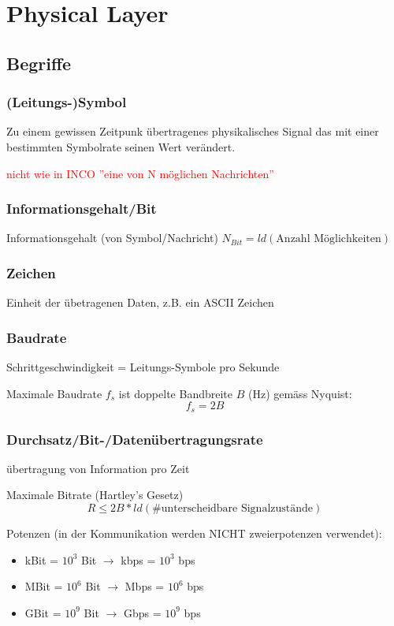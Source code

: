 \section{Physical Layer}

\subsection{Begriffe}

\subsubsection{(Leitungs-)Symbol}
Zu einem gewissen Zeitpunk übertragenes physikalisches Signal das mit einer
bestimmten Symbolrate seinen Wert verändert.

\textcolor{red}{nicht wie in INCO ''eine von N möglichen Nachrichten''}

\subsubsection{Informationsgehalt/Bit}
Informationsgehalt (von Symbol/Nachricht)
$ N_{Bit} = ld(\text{Anzahl Möglichkeiten}) $

\subsubsection{Zeichen}
Einheit der übetragenen Daten, z.B. ein ASCII Zeichen

\subsubsection{Baudrate}
Schrittgeschwindigkeit = Leitungs-Symbole pro Sekunde

Maximale Baudrate $f_s$ ist doppelte Bandbreite $B$ (Hz) gemäss Nyquist:
$$f_s = 2B$$

\subsubsection{Durchsatz/Bit-/Datenübertragungsrate}
übertragung von Information pro Zeit

Maximale Bitrate (Hartley's Gesetz)
$$R \le 2B * ld(\text{\#unterscheidbare Signalzustände})$$

Potenzen (in der Kommunikation werden NICHT zweierpotenzen verwendet):
\begin{itemize}
	\item kBit = $10^3$ Bit $\rightarrow$ kbps = $10^3$ bps
	\item MBit = $10^6$ Bit $\rightarrow$ Mbps = $10^6$ bps
	\item GBit = $10^9$ Bit $\rightarrow$ Gbps = $10^9$ bps
\end{itemize}

